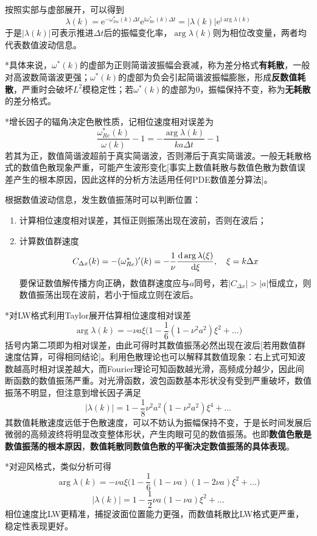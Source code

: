 \documentclass[a4paper,UTF8,fontset=windows]{ctexart}
\newcommand*{\dr}{\hspace{0.07em}\mathrm{d}}
\begin{document}
按照实部与虚部展开，可以得到
$$\lambda(k)=\mathrm{e}^{-\omega_{Im}^*(k)\Delta t}\mathrm{e}^{\mathrm{i}\omega_{Re}^*(k)\Delta t}=|\lambda(k)|\mathrm{e}^{\mathrm{i}\arg\lambda(k)}$$
于是$|\lambda(k)|$可表示推进$\Delta t$后的振幅变化率，$\arg\lambda(k)$则为相位改变量，两者均代表数值波动信息。

*具体来说，$\omega^*(k)$的虚部为正则简谐波振幅会衰减，称为差分格式\textbf{有耗散}，一般对高波数简谐波更强；$\omega^*(k)$的虚部为负会引起简谐波振幅膨胀，形成\textbf{反数值耗散}，严重时会破坏$L^2$模稳定性；若$\omega^*(k)$的虚部为0，振幅保持不变，称为\textbf{无耗散}的差分格式。

*增长因子的辐角决定色散性质，记相位速度相对误差为
$$\frac{\omega^*_{Re}(k)}{\omega(k)}-1=-\frac{\arg\lambda(k)}{ka\Delta t}-1$$
若其为正，数值简谐波超前于真实简谐波，否则滞后于真实简谐波。一般无耗散格式的数值色散现象严重，可能产生波形变化[事实上数值耗散与数值色散为数值误差产生的根本原因，因此这样的分析方法适用任何PDE数值差分算法]。

根据数值波动信息，发生数值振荡时可以判断位置：
\begin{enumerate}
    \item 计算相位速度相对误差，其恒正则振荡出现在波前，否则在波后；
    \item 计算数值群速度
    $$C_{\Delta x}(k)=-(\omega_{Re}^*)'(k)=-\frac{1}{\nu}\frac{\dr\arg\lambda(\xi)}{\dr\xi},\quad\xi=k\Delta x$$
    要保证数值解传播方向正确，数值群速度应与$a$同号，若$|C_{\Delta x}|>|a|$恒成立，则数值振荡出现在波前，若小于恒成立则在波后。
\end{enumerate}

*对LW格式利用Taylor展开估算相位速度相对误差
$$\arg\lambda(k)=-\nu a\xi\bigg(1-\frac{1}{6}(1-\nu^2a^2)\xi^2+\dots\bigg)$$
括号内第二项即为相对误差，由此可得时其数值振荡必然出现在波后[若用数值群速度估算，可得相同结论]。利用色散理论也可以解释其数值现象：右上式可知波数越高时相对误差越大，而Fourier理论可知函数越光滑，高频成分越少，因此间断函数的数值振荡严重。对光滑函数，波包函数基本形状没有受到严重破坏，数值振荡不明显，但注意到增长因子满足
$$|\lambda(k)|=1-\frac{1}{8}\nu^2a^2(1-\nu^2a^2)\xi^4+\dots$$
其数值耗散速度远低于色散速度，可以不妨认为振幅保持不变，于是长时间发展后微弱的高频波终将明显改变整体形状，产生肉眼可见的数值振荡。也即\textbf{数值色散是数值振荡的根本原因}，\textbf{数值耗散同数值色散的平衡决定数值振荡的具体表现}。

*对迎风格式，类似分析可得
$$\arg\lambda(k)=-\nu a\xi\bigg(1-\frac{1}{6}(1-\nu a)(1-2\nu a)\xi^2+\dots\bigg)$$
$$|\lambda(k)|=1-\frac{1}{2}\nu a(1-\nu a)\xi^2+\dots$$
相位速度比LW更精准，捕捉波面位置能力更强，而数值耗散比LW格式更严重，稳定性表现更好。
\end{document}
